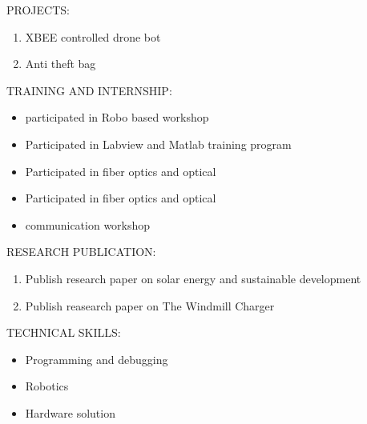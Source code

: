 \documentclass[11pt,a4paper]{article}
\begin{document}
\begin{flushleft}
		\textsf{PROJECTS:}\\
		\begin{enumerate}
			\item  XBEE controlled drone bot
			\item  Anti theft bag
		\end{enumerate}
			\textsf{TRAINING AND INTERNSHIP:}\\
			\begin{itemize}
				\item  participated in Robo based workshop\\
				\item  Participated in Labview and Matlab training program\\
				\item  Participated in fiber optics and optical\\
				\item  Participated in fiber optics and optical\\
				\item communication workshop
			\end{itemize}
				\textsf{RESEARCH PUBLICATION:}
				\begin{enumerate}
					\item Publish research paper on solar energy and sustainable development\\ 
					\item Publish reasearch paper on The Windmill Charger\\ 
				\end{enumerate} 
			\textsf{TECHNICAL SKILLS:}\\
			\begin{itemize}
				\item Programming and debugging\\
				\item Robotics \\
				\item Hardware solution\\
			\end{itemize}
	
\end{flushleft}

 
\end{document}
